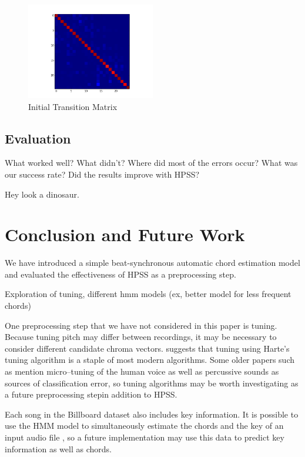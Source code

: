 \documentclass{article}
\begin{document}
\begin{figure}
   \centering
   \includegraphics[width=0.5\textwidth]{trans-h.png}
   \caption{Initial Transition Matrix}
   \label{fig:transmath}
\end{figure}

\subsection{Evaluation}


What worked well? What didn't? Where did most of the errors occur?
What was our success rate? Did the results improve with HPSS?

Hey look a dinosaur.

\section{Conclusion and Future Work}

We have introduced a simple beat-synchronous automatic chord estimation model
and evaluated the effectiveness of HPSS as a preprocessing step.

Exploration of tuning, different hmm models (ex, better model for less frequent chords)

One preprocessing step that we have not considered in this paper is tuning. Because tuning pitch 
may differ between recordings, it may be necessary to consider different candidate chroma vectors. 
\cite{McVicar:00} suggests that tuning using Harte's tuning algorithm is a staple of most modern
algorithms. Some older papers such as \cite{Zenz:20} mention micro--tuning of the human voice as well 
as percussive sounds as sources of classification error, so tuning algorithms may be worth investigating 
as a future preprocessing stepin addition to HPSS. 

Each song in the Billboard dataset also includes key information. It is possible to use the HMM model to 
simultaneously estimate the chords and the key of an input audio file \cite{McVicar:00}, so a future
implementation may use this data to predict key information as well as chords.
\end{document}
